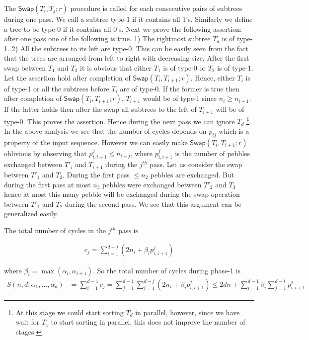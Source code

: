 \documentclass[runningheads,a4paper]{llncs}
\begin{document}
The $\mathsf{Swap}(T_i,T_{j};r)$ procedure is called for each consecutive pairs of subtrees during one pass. We call a subtree type-1 if it contains all 1's. Similarly we define a tree to be type-0 if it contains all 0's. Next we prove the following assertion: after one pass one of the following is true. 1) The rightmost subtree $T_d$ is of type-1. 2) All the subtrees to its left are type-0. This can be easily seen from the fact that the trees are arranged from left to right with decreasing size. After the first swap between $T_1$ and $T_2$ it is obvious that either $T_1$ is of type-0 or $T_2$  is of type-1. Let the assertion hold after completion of $\mathsf{Swap}(T_i,T_{i+1};r)$. Hence, either $T_i$ is of type-1 or all the subtrees before $T_i$ are of type-0. If the former is true then after completion of $\mathsf{Swap}(T_i,T_{i+1};r)$, $T_{i+1}$ would be of type-1 since $n_i \ge n_{i+1}$. If the latter holds then after the swap all subtrees to the left of $T_{i+1}$ will be of type-0. This proves the assertion. Hence during the next pass we can ignore $T_d$ \footnote{At this stage we could start sorting $T_d$ in parallel, however, since we have wait for $T_1$ to start sorting in parallel, this does not improve the number of stages.}. In the above analysis we see that the number of cycles depends on $p_{ij}$ which is a property of the input sequence. However we can easily make $\mathsf{Swap}(T_i,T_{i+1};r)$ oblivious by observing that $p^j_{i,i+1} \le n_{i+j}$, where $p^j_{i,i+1}$ is the number of pebbles exchanged between $T'_i$ and $T_{i+1}$ during the $j^{th}$ pass. Let us consider the swap between $T'_1$ and $T_2$. During the first pass $\le n_2$ pebbles are exchanged. But during the first pass at most $n_3$ pebbles were exchanged between $T'_2$ and $T_3$ hence at most this many pebble will be exchanged during the swap operation between $T'_1$ and $T_2$ during the second pass. We see that this argument can be generalized easily. 

The total number of cycles in the $j^{th}$ pass is

\begin{align}
c_j = \sum_{i=1}^{d-j}{(2n_i+\beta_ip^j_{i,i+1})}
\end{align}

\noindent  where $\beta_i = \max(\alpha_i,\alpha_{i+1})$. So the total number of cycles during phase-1 is
\begin{align}
S(n,d; \alpha_1,\ldots,\alpha_d) &= \sum_{i=1}^{d-1}{c_j} = \sum_{j=1}^{d-1}\sum_{i=1}^{d-j}{(2n_i+\beta_ip^j_{i,i+1})} \le 2dn + \sum_{i=1}^{d-1}{\beta_i\sum_{j=1}^{d-i}{p^j_{i,i+1}}} 
\end{align}
\end{document}
